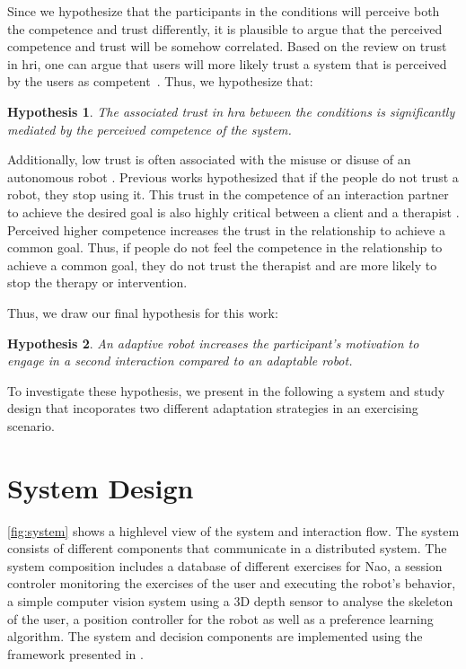\documentclass[twocolumn]{svjour3}          %
\newtheorem{hypo}{Hypothesis}
\begin{document}
Since we hypothesize that the participants in the
conditions will perceive both the competence and trust differently, it is plausible to argue that the perceived competence and trust will be somehow correlated. Based on the review on trust in \gls{hri}, one can argue that users will more likely trust a system that is perceived by the users as competent~\cite{hancock2011meta}. Thus, we hypothesize that: 

\begin{hypo}\label{hyp:adaptability:mediation}
 The associated trust in \gls{hra} between the conditions is significantly mediated by the perceived competence of the system.
\end{hypo}


Additionally, low trust is often associated with the misuse or disuse of
an autonomous robot \autocite{beer2014toward}. Previous works
hypothesized that if the people do not trust a robot, they stop using
it. This trust in the competence of an interaction partner to achieve
the desired goal is also highly critical between a client and a
therapist \autocite{horvath1989development}. Perceived higher competence
increases the trust in the relationship to achieve a common goal. Thus,
if people do not feel the competence in the relationship to achieve a
common goal, they do not trust the therapist and are more likely to stop
the therapy or intervention.

Thus, we draw our final hypothesis for this work:

\begin{hypo}\label{hyp:adaptability:motivation}
 An \textit{adaptive} robot increases the participant's motivation to engage in a second interaction compared to an \textit{adaptable} robot.
\end{hypo}

To investigate these hypothesis, we present in the following a system and study design that incoporates two different adaptation strategies in an exercising scenario.

\hypertarget{system-design}{%
\section{\texorpdfstring{System Design
\label{adaptation:sec:system}}{System Design }}\label{system-design}}

\autoref{fig:system} shows a highlevel view of the system and interaction flow. The system consists of different components that communicate in a distributed system. The system composition includes a database of different exercises for
Nao, a session controler monitoring the exercises of the user and executing the robot's behavior, a simple
computer vision system using a 3D depth sensor to analyse the skeleton of the user, a position controller for the robot as well as a preference learning algorithm. The system and decision components are implemented using the framework presented in \cite{schneider2017framework}.
\end{document}
